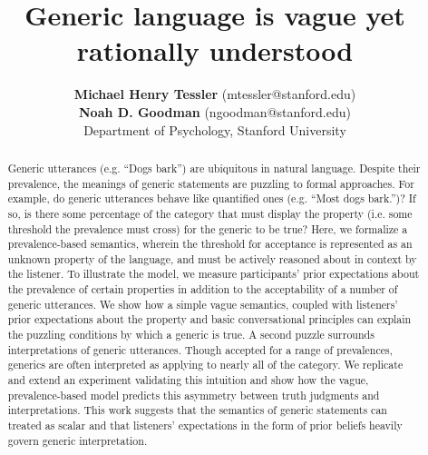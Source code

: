 \documentclass[10pt,letterpaper]{article}
\title{Generic language is vague yet rationally understood}
\author{{\large \bf Michael Henry Tessler} (mtessler@stanford.edu)\\ {\large \bf Noah D. Goodman} (ngoodman@stanford.edu) \\
  Department of Psychology, Stanford University}
\begin{document}
\maketitle


\begin{abstract}
Generic utterances (e.g. ``Dogs bark'') are ubiquitous in natural language. Despite their prevalence, the meanings of generic statements are puzzling to formal approaches. 
For example, do generic utterances behave like quantified ones (e.g. ``Most dogs bark.'')? 
If so, is there some percentage of the category that must display the property (i.e. some threshold  the prevalence must cross) for the generic to be true? 
Here, we formalize a prevalence-based semantics, wherein the threshold for acceptance is represented as an unknown property of the language, and must be actively reasoned about in context by the listener. 
To illustrate the model, we measure participants' prior expectations about the prevalence of certain properties in addition to the acceptability of a number of generic utterances. 
We show %
how a simple vague semantics, coupled with listeners' prior expectations about the property and basic conversational principles can explain the puzzling conditions by which a generic is true.
A second puzzle surrounds interpretations of generic utterances. Though accepted for a range of prevalences,  generics are often interpreted as applying to nearly all of the category. 
We replicate and extend an experiment validating this intuition and show how the vague, prevalence-based model predicts this asymmetry between truth judgments and interpretations. 
This work suggests that the semantics of generic statements can treated as scalar and that listeners' expectations in the form of prior beliefs heavily govern generic interpretation. 


\end{abstract}
\end{document}
